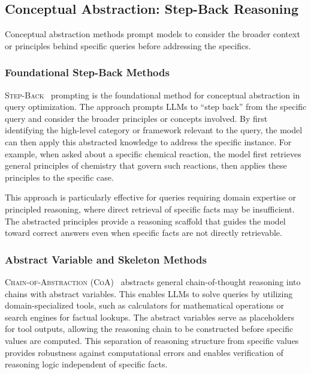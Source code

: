 \documentclass{article}
\begin{document}
\subsection{Conceptual Abstraction: Step-Back Reasoning}

Conceptual abstraction methods prompt models to consider the broader context or principles behind specific queries before addressing the specifics.

\subsubsection{Foundational Step-Back Methods}

\textsc{Step-Back}~\citep{StepBack} prompting is the foundational method for conceptual abstraction in query optimization. The approach prompts LLMs to ``step back'' from the specific query and consider the broader principles or concepts involved. By first identifying the high-level category or framework relevant to the query, the model can then apply this abstracted knowledge to address the specific instance. For example, when asked about a specific chemical reaction, the model first retrieves general principles of chemistry that govern such reactions, then applies these principles to the specific case.

This approach is particularly effective for queries requiring domain expertise or principled reasoning, where direct retrieval of specific facts may be insufficient. The abstracted principles provide a reasoning scaffold that guides the model toward correct answers even when specific facts are not directly retrievable.

\subsubsection{Abstract Variable and Skeleton Methods}

\textsc{Chain-of-Abstraction (CoA)}~\citep{CoA} abstracts general chain-of-thought reasoning into chains with abstract variables. This enables LLMs to solve queries by utilizing domain-specialized tools, such as calculators for mathematical operations or search engines for factual lookups. The abstract variables serve as placeholders for tool outputs, allowing the reasoning chain to be constructed before specific values are computed. This separation of reasoning structure from specific values provides robustness against computational errors and enables verification of reasoning logic independent of specific facts.
\end{document}
